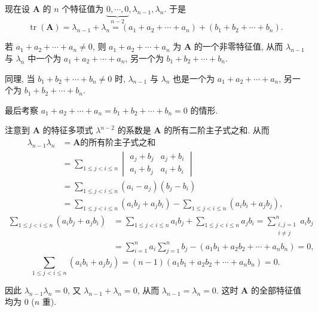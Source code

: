 \documentclass[../../main.tex]{subfiles}
\begin{document}
\begin{solution}
现在设 $\boldsymbol{A}$ 的 $n$ 个特征值为 $\underbrace{0, \cdots, 0}_{n - 2}, \lambda_{n - 1}, \lambda_n$. 于是
$$
\operatorname{tr}(\boldsymbol{A}) = \lambda_{n - 1} + \lambda_n = (a_1 + a_2 + \cdots + a_n) + (b_1 + b_2 + \cdots + b_n).
$$

若 $a_1 + a_2 + \cdots + a_n \neq 0$, 则 $a_1 + a_2 + \cdots + a_n$ 为 $\boldsymbol{A}$ 的一个非零特征值, 从而 $\lambda_{n - 1}$ 与 $\lambda_n$ 中一个为 $a_1 + a_2 + \cdots + a_n$, 另一个为 $b_1 + b_2 + \cdots + b_n$.

同理, 当 $b_1 + b_2 + \cdots + b_n \neq 0$ 时, $\lambda_{n - 1}$ 与 $\lambda_n$ 也是一个为 $a_1 + a_2 + \cdots + a_n$, 另一个为 $b_1 + b_2 + \cdots + b_n$.

最后考察 $a_1 + a_2 + \cdots + a_n = b_1 + b_2 + \cdots + b_n = 0$ 的情形.

注意到 $\boldsymbol{A}$ 的特征多项式 $\lambda^{n - 2}$ 的系数是 $\boldsymbol{A}$ 的所有二阶主子式之和. 从而
$$
\begin{aligned}
\lambda_{n - 1}\lambda_n &= \boldsymbol{A} \text{的所有阶主子式之和} \\
&= \sum_{1 \leqslant j < i \leqslant n} \begin{vmatrix} a_j + b_j & a_j + b_i \\ a_i + b_j & a_i + b_i \end{vmatrix} \\
&= \sum_{1 \leqslant j < i \leqslant n} (a_i - a_j)(b_j - b_i) \\
&= \sum_{1 \leqslant j < i \leqslant n} (a_ib_j + a_jb_i) - \sum_{1 \leqslant j < i \leqslant n} (a_ib_i + a_jb_j),
\end{aligned}
$$
$$
\begin{aligned}
\sum_{1 \leqslant j < i \leqslant n} (a_ib_j + a_jb_i) &= \sum_{1 \leqslant j < i \leqslant n} a_ib_j + \sum_{1 \leqslant j < i \leqslant n} a_jb_i = \sum_{\substack{i, j = 1 \\ i \neq j}}^n a_ib_j \\
&= \sum_{i = 1}^n a_i \sum_{j = 1}^n b_j - (a_1b_1 + a_2b_2 + \cdots + a_nb_n) = 0,
\end{aligned}
$$
$$
\sum_{1 \leqslant j < i \leqslant n} (a_ib_i + a_jb_j) = (n - 1)(a_1b_1 + a_2b_2 + \cdots + a_nb_n) = 0.
$$

因此 $\lambda_{n - 1}\lambda_n = 0$, 又 $\lambda_{n - 1} + \lambda_n = 0$, 从而 $\lambda_{n - 1} = \lambda_n = 0$. 这时 $\boldsymbol{A}$ 的全部特征值均为 $0$ ($n$ 重).


\end{solution}
\end{document}
